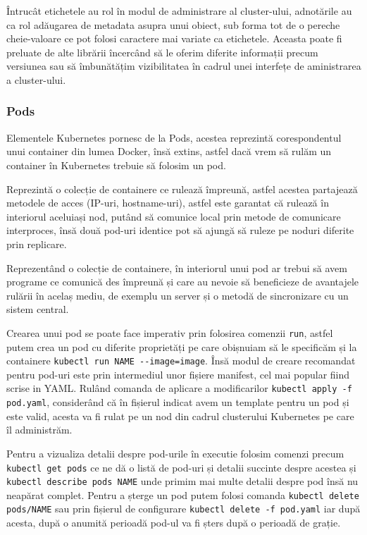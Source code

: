 Întrucât etichetele au rol în modul de administrare al cluster-ului, adnotările au ca rol
adăugarea de metadata asupra unui obiect, sub forma tot de o pereche cheie-valoare ce pot 
folosi caractere mai variate ca etichetele. Aceasta poate fi preluate de alte librării
încercând să le oferim diferite informații precum versiunea sau să îmbunătățim 
vizibilitatea în cadrul unei interfețe de aministrarea a cluster-ului. 

\subsubsection{Pods}

Elementele Kubernetes pornesc de la Pods, acestea reprezintă corespondentul unui container
din lumea Docker, însă extins, astfel dacă vrem să rulăm un container în Kubernetes trebuie 
să folosim un pod.

Reprezintă o colecție de containere ce rulează împreună, astfel acestea partajează
metodele de acces (IP-uri, hostname-uri), astfel este garantat că rulează în interiorul
aceluiași nod, putând să comunice local prin metode de comunicare interproces, însă
două pod-uri identice pot să ajungă să ruleze pe noduri diferite prin replicare.

Reprezentând o colecție de containere, în interiorul unui pod ar trebui să 
avem programe ce comunică des împreună și care au nevoie să beneficieze de avantajele rulării
în acelaș mediu, de exemplu un server și o metodă de sincronizare cu un sistem central.

Crearea unui pod se poate face imperativ prin folosirea comenzii \verb|run|,
astfel putem crea un pod cu diferite proprietăți
pe care obișnuiam să le specificăm și la containere
\verb|kubectl run NAME --image=image|. Însă modul de creare recomandat 
pentru pod-uri este prin intermediul unor fișiere manifest, cel mai popular fiind scrise in YAML.
Rulând comanda de aplicare a modificarilor \verb|kubectl apply -f pod.yaml|, considerând
că în fișierul indicat avem un template pentru un pod și este valid, acesta va fi 
rulat pe un nod din cadrul clusterului Kubernetes pe care îl administrăm.

Pentru a vizualiza detalii despre pod-urile în executie folosim comenzi precum\\
\verb|kubectl get pods| ce ne dă o listă de pod-uri și detalii succinte despre acestea
și\\ \verb|kubectl describe pods NAME| unde primim mai multe detalii despre pod însă nu 
neapărat complet. Pentru a șterge un pod putem folosi comanda \verb|kubectl delete pods/NAME| sau
prin fișierul de configurare \verb|kubectl delete -f pod.yaml| iar după acesta, după o anumită
perioadă pod-ul va fi șters după o perioadă de grație.

